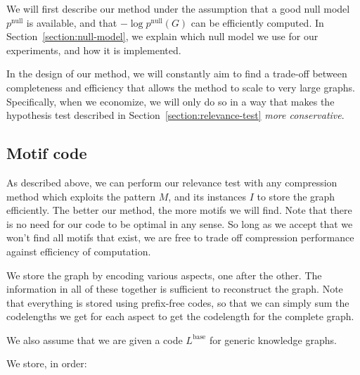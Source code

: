\documentclass[11pt]{article}
\begin{document}
We will first describe our method under the assumption that a good null model $p^\text{null}$ is available, and that $- \log p^\text{null}(G)$ can be efficiently computed. In Section~\ref{section:null-model}, we explain which null model we use for our experiments, and how it is implemented. 

In the design of our method, we will constantly aim to find a trade-off between completeness and efficiency that allows the method to scale to very large graphs. Specifically, when we economize, we will only do so in a way that makes the hypothesis test described in Section~\ref{section:relevance-test} \emph{more conservative}.

\subsection{Motif code}

As described above, we can perform our relevance test with any compression method which exploits the pattern $M$, and its instances $I$ to store the graph efficiently. The better our method, the more motifs we will find. Note that there is no need for our code to be optimal in any sense. So long as we accept that we won't find all motifs that exist, we are free to trade off compression performance against efficiency of computation.

We store the graph by encoding various aspects, one after the other. The information in all of these together is sufficient to reconstruct the graph. Note that everything is stored using prefix-free codes, so that we can simply sum the codelengths we get for each aspect to get the codelength for the complete graph.

We also assume that we are given a code $L^\text{base}$ for generic knowledge graphs.

We store, in order:
\end{document}

